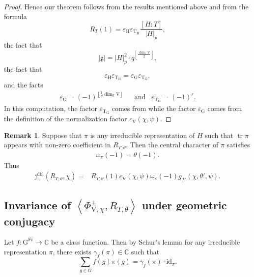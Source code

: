 \documentclass[12pt, reqno]{amsart}
\theoremstyle{definition}
\theoremstyle{definition}
\newtheorem{remark}[theorem]{Remark}
\theoremstyle{definition}
\newcommand{\cComplex}{\mathbb{C}}
\newcommand{\idmap}{\mathrm{id}}
\newcommand{\sizeof}[1]{\left|#1\right|}
\newcommand{\hermitianSpace}{\mathrm{V}}
\newcommand{\innerproduct}[2]{\left\langle #1,#2\right\rangle}
\newcommand{\fieldCharacter}{\psi}
\newcommand{\centralCharacter}[1]{\omega_{#1}}
\newcommand{\grpIndex}[2]{\left[#1:#2\right]}
\newcommand{\trace}{\operatorname{tr}}
\newcommand{\finiteField}{\mathbb{F}}
\newcommand{\Frobenius}{\operatorname{Fr}}
\newcommand{\genHermitianJacobiKernel}[2]{\Phi^{\pm}_{#1,#2}}
\newcommand{\dblNegVirtualJacobiSumScalar}[2]{\mathrm{j}_{-}^{\mathrm{dbl}}\left(#1, #2\right)}
\newcommand{\lieAlgebra}{\mathfrak{g}}
\newcommand{\algebraicGroup}[1]{\boldsymbol{\mathrm{#1}}}
\begin{document}
\begin{proof}
	
	Hence our theorem follows from the results mentioned above and from the formula $$R_T\left(1\right) = \varepsilon_{\algebraicGroup{H}} \varepsilon_{\algebraicGroup{T}_{\algebraicGroup{H}}} \frac{\grpIndex{H}{T}}{\sizeof{H}_p},$$ the fact that $$ \sizeof{\lieAlgebra} = \sizeof{H}_p^2 \cdot q^{\left\lfloor\frac{\dim_{\finiteField} \hermitianSpace}{2}\right\rfloor},$$
	the fact that \begin{equation*}
		\varepsilon_{\algebraicGroup{H}} \varepsilon_{\algebraicGroup{T}_{\algebraicGroup{H}}} = \varepsilon_{\algebraicGroup{G}} \varepsilon_{\algebraicGroup{T}_{\algebraicGroup{G}}},
	\end{equation*}
	and the facts
	\begin{align*}
		\varepsilon_{\algebraicGroup{G}} = \left(-1\right)^{\left\lfloor \frac{1}{2}\dim_{\finiteField} \hermitianSpace \right\rfloor} & \,\,\,\,\,\text{and}\,\,\,\,\, \varepsilon_{\algebraicGroup{T}_{\algebraicGroup{G}}} = \left(-1\right)^r.
	\end{align*}
	In this computation, the factor $\varepsilon_{\algebraicGroup{T}_{\algebraicGroup{G}}}$ comes from  while the factor $\varepsilon_{\algebraicGroup{G}}$ comes from the definition of the normalization factor $c_{\hermitianSpace}\left(\chi, \fieldCharacter\right)$.
\end{proof}
\begin{remark}
	Suppose that $\pi$ is any irreducible representation of $H$ such that $\trace \pi$ appears with non-zero coefficient in $R_{T,\theta}$. Then the central character of $\pi$ satisfies
	\begin{align*}
		\centralCharacter{\pi}\left(-1\right) = \theta\left(-1\right).
	\end{align*}
	Thus \begin{align*}
		\dblNegVirtualJacobiSumScalar{R_{T, \theta}}{\chi} =& R_{T,\theta}\left(1\right) c_{\hermitianSpace}\left(\chi, \fieldCharacter\right) \centralCharacter{\pi}\left(-1\right) g_{T'}\left(\chi, \theta', \fieldCharacter\right).
	\end{align*}
\end{remark}

\subsection{Invariance of $\innerproduct{\genHermitianJacobiKernel{\hermitianSpace}{\chi}}{R_{T,\theta}}$ under geometric conjugacy}

Let $f \colon \algebraicGroup{G}^{\Frobenius} \to \cComplex$ be a class function. Then by Schur's lemma for any irreducible representation $\pi$, there exists $\gamma_{f}\left(\pi\right) \in \cComplex$ such that $$\sum_{g \in G} f(g)\pi(g) = \gamma_{f}\left(\pi\right) \cdot \idmap_{\pi}.$$
\end{document}
